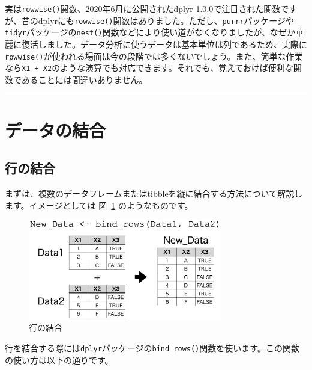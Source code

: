 \documentclass[
  a4paper,
  pandoc,
  ja=standard,
  jafont=haranoaji]{bxjsbook}
\begin{document}
実は\texttt{rowwise()}関数、2020年6月に公開されたdplyr
1.0.0で注目された関数ですが、昔のdplyrにも\texttt{rowwise()}関数はありました。ただし、\texttt{purrr}パッケージや\texttt{tidyr}パッケージの\texttt{nest()}関数などにより使い道がなくなりましたが、なぜか華麗に復活しました。データ分析に使うデータは基本単位は列であるため、実際に\texttt{rowwise()}が使われる場面は今の段階では多くないでしょう。また、簡単な作業なら\texttt{X1\ +\ X2}のような演算でも対応できます。それでも、覚えておけば便利な関数であることには間違いありません。

\begin{center}\rule{0.5\linewidth}{0.5pt}\end{center}

\hypertarget{sec-handling2_merge}{%
\section{データの結合}\label{sec-handling2_merge}}

\hypertarget{ux884cux306eux7d50ux5408}{%
\subsection{行の結合}\label{ux884cux306eux7d50ux5408}}

まずは、複数のデータフレームまたはtibbleを縦に結合する方法について解説します。イメージとしては
図~\ref{fig-handling2_merge_row} のようなものです。

\begin{figure}

{\centering \includegraphics[width=0.75\textwidth,height=\textheight]{./Figs/Handling2/Merge1.png}

}

\caption{\label{fig-handling2_merge_row}行の結合}

\end{figure}

行を結合する際には\texttt{dplyr}パッケージの\texttt{bind\_rows()}関数を使います。この関数の使い方は以下の通りです。
\end{document}
